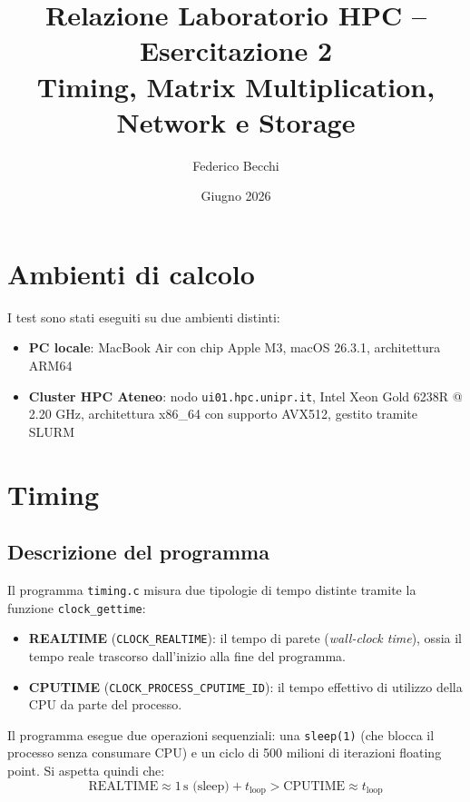 \documentclass[a4paper,12pt]{article}
\title{Relazione Laboratorio HPC -- Esercitazione 2\\
\large Timing, Matrix Multiplication, Network e Storage}
\author{Federico Becchi}
\date{Giugno 2026}
\begin{document}
\maketitle
\tableofcontents
\newpage

\section{Ambienti di calcolo}

I test sono stati eseguiti su due ambienti distinti:

\begin{itemize}
    \item \textbf{PC locale}: MacBook Air con chip Apple M3, macOS 26.3.1, architettura ARM64
    \item \textbf{Cluster HPC Ateneo}: nodo \texttt{ui01.hpc.unipr.it}, Intel Xeon Gold 6238R @ 2.20 GHz, architettura x86\_64 con supporto AVX512, gestito tramite SLURM
\end{itemize}

\section{Timing}

\subsection{Descrizione del programma}

Il programma \texttt{timing.c} misura due tipologie di tempo distinte tramite la funzione \texttt{clock\_gettime}:

\begin{itemize}
    \item \textbf{REALTIME} (\texttt{CLOCK\_REALTIME}): il tempo di parete (\textit{wall-clock time}), ossia il tempo reale trascorso dall'inizio alla fine del programma.
    \item \textbf{CPUTIME} (\texttt{CLOCK\_PROCESS\_CPUTIME\_ID}): il tempo effettivo di utilizzo della CPU da parte del processo.
\end{itemize}

Il programma esegue due operazioni sequenziali: una \texttt{sleep(1)} (che blocca il processo senza consumare CPU) e un ciclo di 500 milioni di iterazioni floating point. Si aspetta quindi che:
\[
\text{REALTIME} \approx 1\,\text{s (sleep)} + t_{\text{loop}} > \text{CPUTIME} \approx t_{\text{loop}}
\]
\end{document}
